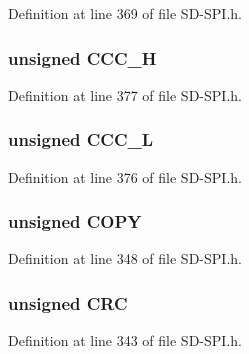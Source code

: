 Definition at line 369 of file S\+D-\/\+S\+P\+I.\+h.

\hypertarget{union_c_s_d_ac354cfa2e9734511649b435bc56a69a7}{}
\subsubsection[{C\+C\+C\+\_\+\+H}]{\setlength{\rightskip}{0pt plus 5cm}unsigned C\+C\+C\+\_\+\+H}\label{union_c_s_d_ac354cfa2e9734511649b435bc56a69a7}


Definition at line 377 of file S\+D-\/\+S\+P\+I.\+h.

\hypertarget{union_c_s_d_a2f0b3bbc97ca147c996fdfddc22b3101}{}
\subsubsection[{C\+C\+C\+\_\+\+L}]{\setlength{\rightskip}{0pt plus 5cm}unsigned C\+C\+C\+\_\+\+L}\label{union_c_s_d_a2f0b3bbc97ca147c996fdfddc22b3101}


Definition at line 376 of file S\+D-\/\+S\+P\+I.\+h.

\hypertarget{union_c_s_d_a2317c39e8e0a74a691775ca01c3b6292}{}
\subsubsection[{C\+O\+P\+Y}]{\setlength{\rightskip}{0pt plus 5cm}unsigned C\+O\+P\+Y}\label{union_c_s_d_a2317c39e8e0a74a691775ca01c3b6292}


Definition at line 348 of file S\+D-\/\+S\+P\+I.\+h.

\hypertarget{union_c_s_d_ab9e9fe7c42064ff2fcd04adcda3a6919}{}
\subsubsection[{C\+R\+C}]{\setlength{\rightskip}{0pt plus 5cm}unsigned C\+R\+C}\label{union_c_s_d_ab9e9fe7c42064ff2fcd04adcda3a6919}


Definition at line 343 of file S\+D-\/\+S\+P\+I.\+h.

\hypertarget{union_c_s_d_a78f3c2b6b7cc51cf8ecf0a68051dd7e1}{}
